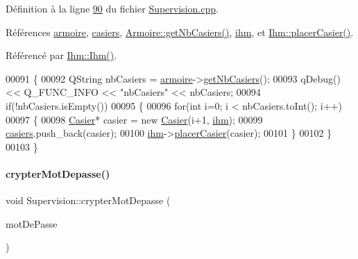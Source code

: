 Définition à la ligne \hyperlink{_supervision_8cpp_source_l00090}{90} du fichier \hyperlink{_supervision_8cpp_source}{Supervision.\+cpp}.



Références \hyperlink{_supervision_8h_source_l00084}{armoire}, \hyperlink{_supervision_8h_source_l00086}{casiers}, \hyperlink{_armoire_8cpp_source_l00127}{Armoire\+::get\+Nb\+Casiers()}, \hyperlink{_supervision_8h_source_l00079}{ihm}, et \hyperlink{_ihm_8cpp_source_l00087}{Ihm\+::placer\+Casier()}.



Référencé par \hyperlink{_ihm_8cpp_source_l00029}{Ihm\+::\+Ihm()}.


\begin{DoxyCode}
00091 \{
00092     QString nbCasiers = \hyperlink{class_supervision_a9f974b5c47899192395e539a0f11034c}{armoire}->\hyperlink{class_armoire_aa94faaf53b6da5139a22a2ab21d4cf12}{getNbCasiers}();
00093     qDebug() << Q\_FUNC\_INFO << \textcolor{stringliteral}{"nbCasiers"} << nbCasiers;
00094     \textcolor{keywordflow}{if}(!nbCasiers.isEmpty())
00095     \{
00096         \textcolor{keywordflow}{for}(\textcolor{keywordtype}{int} i=0; i < nbCasiers.toInt(); i++)
00097         \{
00098             \hyperlink{class_casier}{Casier}* casier = \textcolor{keyword}{new} \hyperlink{class_casier}{Casier}(i+1, \hyperlink{class_supervision_a5aa823c55bf1531497bbb8fdbc6c5528}{ihm});
00099             \hyperlink{class_supervision_a3ac996538c83f3bd3df36095b0abb1b2}{casiers}.push\_back(casier);
00100             \hyperlink{class_supervision_a5aa823c55bf1531497bbb8fdbc6c5528}{ihm}->\hyperlink{class_ihm_a4ba75b0606c75d616dab3afd67660fd4}{placerCasier}(casier);
00101         \}
00102     \}
00103 \}
\end{DoxyCode}
\mbox{\label{class_supervision_ac58c5b922ce85af75c2233cd3265d201}} 
\paragraph{\texorpdfstring{crypter\+Mot\+Depasse()}{crypterMotDepasse()}}
{\footnotesize\ttfamily void Supervision\+::crypter\+Mot\+Depasse (\begin{DoxyParamCaption}\item[{Q\+String \&}]{mot\+De\+Passe }\end{DoxyParamCaption})\hspace{0.3cm}{\ttfamily [private]}}



